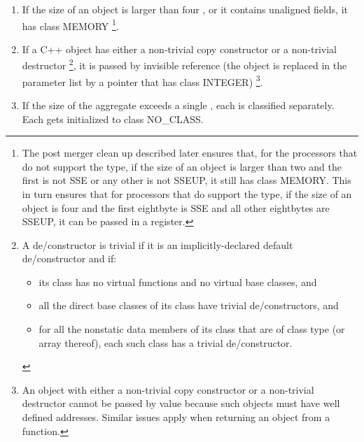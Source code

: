 \begin{enumerate}
\item If the size of an object is larger than four \eightbytes, or
  it contains unaligned fields, it has class MEMORY
  \footnote{The post merger clean up described later ensures that,
  for the processors that do not support the  type, if
  the size of an object is larger than two \eightbytes and the first
  \eightbyte is not SSE or any other \eightbyte is not SSEUP, it still
  has class MEMORY. This in turn ensures that for processors that
  do support the  type, if the size of an object is
  four \eightbytes and the first eightbyte is SSE and all other
  eightbytes are SSEUP, it can be passed in a register.}.

\item If a C++ object has either a non-trivial copy constructor
    or a non-trivial destructor
  \footnote{A de/constructor is trivial if it is an implicitly-declared
             default de/constructor and if:
    \begin{itemize}
        \item its class has no virtual functions
          and no virtual base classes, and

        \item all the direct base classes of its class have trivial
          de/constructors, and

        \item for all the nonstatic data members of its class that are
          of class type (or array thereof), each such class has a
          trivial de/constructor.
    \end{itemize}},
    it is passed by invisible reference
    (the object is replaced in the parameter list by a pointer that
    has class INTEGER)
  \footnote{An object with either a non-trivial copy
   constructor or a non-trivial destructor cannot be passed by value
   because such objects must have well defined addresses.  Similar
   issues apply when returning an object from a function.}.

\item If the size of the aggregate exceeds a single \eightbyte, each is
    classified separately.  Each \eightbyte gets initialized to class NO_CLASS.


\end{enumerate}
